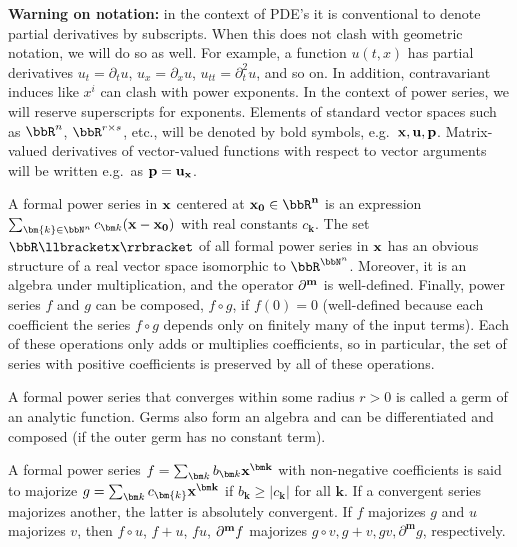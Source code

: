 \textbf{Warning on notation:} in the context of PDE's it is conventional to denote partial derivatives by subscripts. When this does not clash with geometric notation, we will do so as well. For example, a function $u(t,x)$ has partial derivatives $u_t=\partial_t u$, $u_{x}=\partial_x u$, $u_{tt}=\partial_t^2 u$, and so on. In addition, contravariant induces like $x^i$ can clash with power exponents. In the context of power series, we will reserve superscripts for exponents. Elements of standard vector spaces such as $\bbR^n$, $\bbR^{r\times s}$, etc., will be denoted by bold symbols, e.g.\ $\bf{x},\bf{u},\bf{p}$. Matrix-valued derivatives of vector-valued functions with respect to vector arguments will be written e.g.\ as $\bf{p}=\bf{u}_{\bf{x}}$.

\begin{defn}
    A formal power series in $\bf{x}$ centered at $\bf{x}_0\in\bbR^n$ is an expression $\sum_{\bm{k}\in\bbN^n}c_{\bm k}(\bf{x}-\bf{x}_0)$ with real constants $c_{\bm k}$. The set $\bbR\llbracket\bf{x}\rrbracket$ of all formal power series in $\bf{x}$ has an obvious structure of a real vector space isomorphic to $\bbR^{\bbN^n}$. Moreover, it is an algebra under multiplication, and the operator $\partial^{\bf{m}}$ is well-defined. Finally, power series $f$ and $g$ can be composed, $f\circ g$, if $f(0)=0$ (well-defined because each coefficient the series $f\circ g$ depends only on finitely many of the input terms). Each of these operations only adds or multiplies coefficients, so in particular, the set of series with positive coefficients is preserved by all of these operations.
\end{defn}

\begin{defn}
    A formal power series that converges within some radius $r>0$ is called a germ of an analytic function. Germs also form an algebra and can be differentiated and composed (if the outer germ has no constant term).
\end{defn}

\begin{defn}[Majorants]
    A formal power series $f=\sum_{\bm k} b_{\bm k}\bf{x}^{\bm k}$ with non-negative coefficients is said to majorize $g=\sum_{\bm k} c_{\bm{k}}\bf{x}^{\bm k}$ if $b_{\bm k}\geq |c_{\bm k}|$ for all $\bm{k}$. If a convergent series majorizes another, the latter is absolutely convergent. If $f$ majorizes $g$ and $u$ majorizes $v$, then $f\circ u$, $f+u$, $fu$, $\partial^{\bf{m}}f$ majorizes $g\circ v,g+v,gv,\partial^{\bm m}g$, respectively. 
\end{defn}

